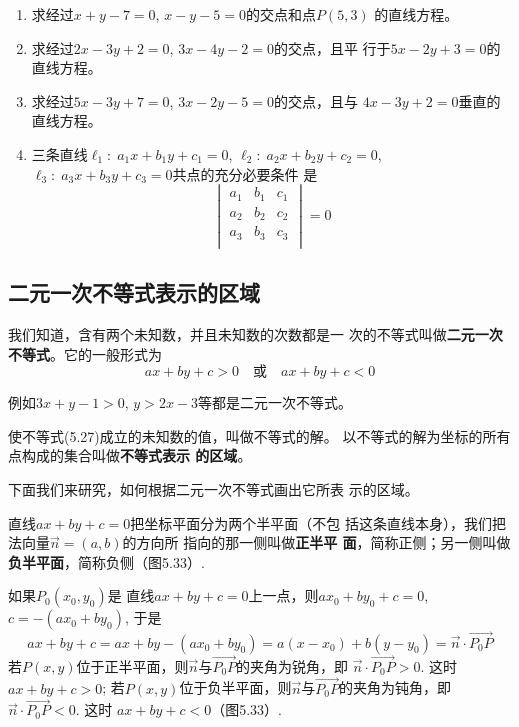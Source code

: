 \begin{ex}
\begin{enumerate}
    \item 求经过$x+y-7=0$, $x-y-5=0$的交点和点$P(5,3)$
    的直线方程。
    \item 求经过$2x-3y+2=0$, $3x-4y-2=0$的交点，且平
    行于$5x-2y+3=0$的直线方程。
    \item 求经过$5x-3y+7=0$, $3x-2y-5=0$的交点，且与
    $4x-3y+2=0$垂直的直线方程。
    \item 三条直线$\ell_1:\; a_1x+b_1y+c_1=0$, $\ell_2:\; a_2x+b_2y+c_2=0$, $\ell_3:\; a_3x+b_3y+c_3=0$共点的充分必要条件
    是
\[\begin{vmatrix}
    a_1&b_1&c_1\\
    a_2&b_2&c_2\\
    a_3&b_3&c_3\\
\end{vmatrix}=0\]
\end{enumerate}
\end{ex}

\subsection{二元一次不等式表示的区域}
我们知道，含有两个未知数，并且未知数的次数都是一
次的不等式叫做\textbf{二元一次不等式}。它的一般形式为
\begin{equation}
    ax+by+c>0\quad \text{或}\quad ax+by+c<0
\end{equation}

例如$3x+y-1>0$, $y>2x-3$等都是二元一次不等式。

使不等式(5.27)成立的未知数的值，叫做不等式的解。
以不等式的解为坐标的所有点构成的集合叫做\textbf{不等式表示
的区域}。

下面我们来研究，如何根据二元一次不等式画出它所表
示的区域。

直线$ax+by+c=0$把坐标平面分为两个半平面（不包
括这条直线本身），我们把
法向量$\vec{n}=(a,b)$的方向所
指向的那一侧叫做\textbf{正半平
面}，简称正侧；另一侧叫做
\textbf{负半平面}，简称负侧（图5.33）.

\begin{figure}[htp]
    \centering
\begin{tikzpicture}[>=stealth]

\end{tikzpicture}
    \caption{}
\end{figure}

如果$P_0(x_0,y_0)$是
直线$ax+by+c=0$上一点，则$ax_0+by_0+c=0$, $c=-(ax_0+by_0)$, 于是
\[ax+by+c=ax+by-(ax_0+by_0)=a(x-x_0)+b(y-y_0)=\vec{n}\cdot \Vec{P_0P}\]
若$P(x,y)$位于正半平面，则$\vec{n}$与$\Vec{P_0P}$的夹角为锐角，即
$\vec{n}\cdot \Vec{P_0P}>0$. 这时$ax+by+c>0$; 若$P(x,y)$位于负半平面，则$\vec{n}$与$\Vec{P_0P}$的夹角为钝角，即$\vec{n}\cdot \Vec{P_0P}<0$. 这时
$ax+by+c<0$（图5.33）.

